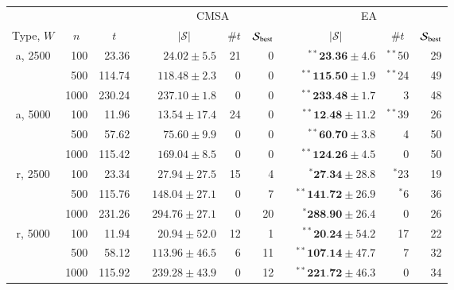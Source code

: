 \documentclass[authoryear]{elsarticle}
\begin{document}
\begin{table}[h!]
\centering
\caption{}
\footnotesize
\begin{threeparttable}
\begin{tabular}{crrcrrrcrrr}
	\toprule
	& & & & \multicolumn{3}{c}{CMSA} &\phantom{ab}& \multicolumn{3}{c}{EA}\\
	\cmidrule{5-7} \cmidrule{9-11}
	\multicolumn{1}{c}{Type, $W$} & \multicolumn{1}{c}{$n$} & \multicolumn{1}{c}{$t$\tnote{$a$}} && \multicolumn{1}{c}{$|\mathcal{S}|$\tnote{$b$}} & \multicolumn{1}{c}{$\# t$\tnote{$c$}} & \multicolumn{1}{c}{$\mathcal{S}_{\textup{best}}$\tnote{$d$}} && \multicolumn{1}{c}{$|\mathcal{S}|$} & \multicolumn{1}{c}{$\# t$} & \multicolumn{1}{c}{$\mathcal{S}_{\textup{best}}$}\\
	\midrule
	a, 2500 & 100 & 23.36 && $24.02 \pm 5.5$ & 21 & 0 && $^{**}\textbf{23.36} \pm 4.6$ & $^{**}$50 & 29 \\
	& 500 & 114.74 && $118.48 \pm 2.3$ & 0 & 0 && $^{**}\textbf{115.50} \pm 1.9$ & $^{**}$24 & 49 \\
	& 1000 & 230.24 && $237.10 \pm 1.8$ & 0 & 0 && $^{**}\textbf{233.48} \pm 1.7$ & 3 & 48 \\
	\midrule
	a, 5000 & 100 & 11.96 && $13.54 \pm 17.4$ & 24 & 0 && $^{**}\textbf{12.48} \pm 11.2$ & $^{**}$39 & 26 \\
	& 500 & 57.62 && $75.60 \pm 9.9$ & 0 & 0 && $^{**}\textbf{60.70} \pm 3.8$ & 4 & 50 \\
	& 1000 & 115.42 && $169.04 \pm 8.5$ & 0 & 0 && $^{**}\textbf{124.26} \pm 4.5$ & 0 & 50 \\
	\midrule
	\midrule
	r, 2500 & 100 & 23.34 && $27.94 \pm 27.5$ & 15 & 4 && $^{*}\textbf{27.34} \pm 28.8$ & $^{*}$23 & 19 \\
	& 500 & 115.76 && $148.04 \pm 27.1$ & 0 & 7 && $^{**}\textbf{141.72} \pm 26.9$ & $^{*}$6 & 36 \\
	& 1000 & 231.26 && $294.76 \pm 27.1$ & 0 & 20 && $^{*}\textbf{288.90} \pm 26.4$ & 0 & 26 \\
	\midrule
	r, 5000 & 100 & 11.94 && $20.94 \pm 52.0$ & 12 & 1 && $^{**}\textbf{20.24} \pm 54.2$ & 17 & 22 \\
	& 500 & 58.12 && $113.96 \pm 46.5$ & 6 & 11 && $^{**}\textbf{107.14} \pm 47.7$ & 7 & 32 \\
	& 1000 & 115.92 && $239.28 \pm 43.9$ & 0 & 12 && $^{**}\textbf{221.72} \pm 46.3$ & 0 & 34 \\
	\bottomrule
\end{tabular}
\vspace{0.2cm} %

\end{threeparttable}
\end{table}
\end{document}
